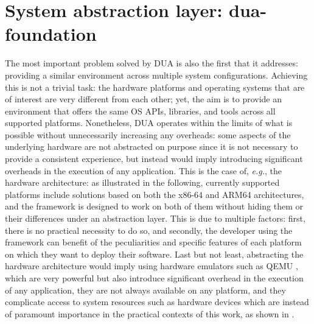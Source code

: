 \section{System abstraction layer: dua-foundation}
\label{sec:dua_foundation}
The most important problem solved by DUA is also the first that it addresses: providing a similar environment across multiple system configurations. Achieving this is not a trivial task: the hardware platforms and operating systems that are of interest are very different from each other; yet, the aim is to provide an environment that offers the same OS APIs, libraries, and tools across all supported platforms. Nonetheless, DUA operates within the limits of what is possible without unnecessarily increasing any overheads: some aspects of the underlying hardware are not abstracted on purpose since it is not necessary to provide a consistent experience, but instead would imply introducing significant overheads in the execution of any application. This is the case of, \emph{e.g.}, the hardware architecture: as illustrated in the following, currently supported platforms include solutions based on both the x86-64 and ARM64 architectures, and the framework is designed to work on both of them without hiding them or their differences under an abstraction layer. This is due to multiple factors: first, there is no practical necessity to do so, and secondly, the developer using the framework can benefit of the peculiarities and specific features of each platform on which they want to deploy their software. Last but not least, abstracting the hardware architecture would imply using hardware emulators such as QEMU \cite{bellard_qemu_nodate}, which are very powerful but also introduce significant overhead in the execution of any application, they are not always available on any platform, and they complicate access to system resources such as hardware devices which are instead of paramount importance in the practical contexts of this work, as shown in .

